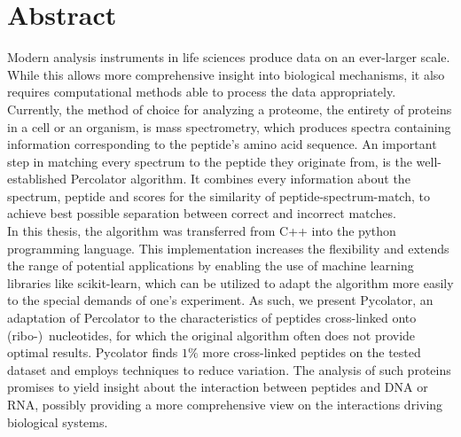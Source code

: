 \documentclass[twoside,12pt,a4paper]{report}
\begin{document}

\setcounter{page}{1}



\section*{Abstract}

Modern analysis instruments in life sciences produce data on an ever-larger scale. While this allows more comprehensive insight into biological mechanisms, it also requires computational methods able to process the data appropriately. Currently, the method of choice for analyzing a proteome, the entirety of proteins in a cell or an organism, is mass spectrometry, which produces spectra containing information corresponding to the peptide's amino acid sequence. An important step in matching every spectrum to the peptide they originate from, is the well-established Percolator algorithm. It combines every information about the spectrum, peptide and scores for the similarity of peptide-spectrum-match, to achieve best possible separation between correct and incorrect matches.\\
In this thesis, the algorithm was transferred from C++ into the python programming language. This implementation increases the flexibility and extends the range of potential applications by enabling the use of machine learning libraries like scikit-learn, which can be utilized to adapt the algorithm more easily to the special demands of one’s experiment. As such, we present Pycolator, an adaptation of Percolator to the characteristics of peptides cross-linked onto (ribo-)~nucleotides, for which the original algorithm often does not provide optimal results. Pycolator finds $1\%$ more cross-linked peptides on the tested dataset and employs techniques to reduce variation. The analysis of such proteins promises to yield insight about the interaction between peptides and DNA or RNA, possibly providing a more comprehensive view on the interactions driving biological systems.

\newpage
\end{document}
